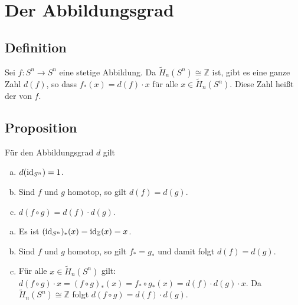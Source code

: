 \section*{Der Abbildungsgrad}

\subsection[Definition: Abbildungsgrad einer stetigen Abbildung $f \colon S^n \to S^n$]{Definition} %
\label{sub:103}
Sei $f \colon S^n \to S^n$ eine stetige Abbildung. Da $\tilde{H}_n(S^n) \cong \mathds{Z}$ ist, gibt es eine ganze Zahl $d(f)$, so dass $f_*(x)= d(f) \cdot x$ für alle 
$x \in \tilde{H}_n(S^n)$. Diese Zahl heißt der  von $f$. 

\subsection[Proposition: Einfache Eigenschaften des Abbildungsgrades]{Proposition} %
\label{sub:104}
Für den Abbildungsgrad $d$ gilt
\begin{enumerate}[a)]
	\item $d(\operatorname{id}_{S^n}) = 1$.
	\item Sind $f$ und $g$ homotop, so gilt $d(f)=d(g)$.
	\item $d(f \circ g) = d(f) \cdot d(g)$.
\end{enumerate}
\begin{enumerate}[a)]
	\item Es ist $(\operatorname{id}_{S^n})_*(x)= \operatorname{id}_{\mathbb{Z}}(x)= x$.
	\item Sind $f$ und $g$ homotop, so gilt $f_*=g_*$ und damit folgt $d(f)=d(g)$.
	\item Für alle $x \in \tilde{H}_n(S^n)$ gilt: $d(f \circ g) \cdot x = (f \circ g)_* (x) = f_* \circ g_*(x)= d(f) \cdot d(g) \cdot x$. Da 
	$\tilde{H}_n(S^n) \cong \mathds{Z}$ folgt $d(f \circ g) = d(f) \cdot d(g)$. \bewende
\end{enumerate}

